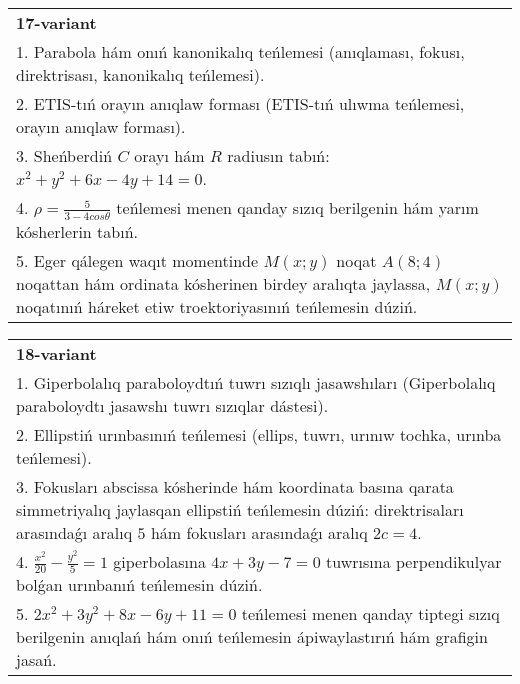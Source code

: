\documentclass{article}
\begin{document}
\begin{tabular}{m{17cm}}
\textbf{17-variant}\\
1. Parabola hám onıń kanonikalıq teńlemesi (anıqlaması, fokusı, direktrisası, kanonikalıq teńlemesi).\\

2. ETIS-tıń orayın anıqlaw forması (ETIS-tıń ulıwma teńlemesi, orayın anıqlaw forması).\\

3. Sheńberdiń $C$ orayı hám $R$ radiusın tabıń: $x^2+y^2+6 x-4 y+14=0$.\\

4. $\rho = \frac{5}{3 - 4cos\theta}$ teńlemesi menen qanday sızıq berilgenin hám yarım kósherlerin tabıń.  \\

5. Eger qálegen waqıt momentinde $M(x;y)$ noqat $A(8;4)$ noqattan hám ordinata kósherinen birdey aralıqta jaylassa, $M(x;y)$ noqatınıń háreket etiw troektoriyasınıń teńlemesin dúziń.  
\end{tabular}
\vspace{1cm}


\begin{tabular}{m{17cm}}
\textbf{18-variant}\\
1. Giperbolalıq paraboloydtıń tuwrı sızıqlı jasawshıları (Giperbolalıq paraboloydtı jasawshı tuwrı sızıqlar dástesi).\\

2. Ellipstiń urınbasınıń teńlemesi (ellips, tuwrı, urınıw tochka, urınba teńlemesi).\\

3. Fokusları abscissa kósherinde hám koordinata basına qarata simmetriyalıq jaylasqan ellipstiń teńlemesin dúziń: direktrisaları arasındaǵı aralıq $5$ hám fokusları arasındaǵı aralıq $2 c=4$.\\

4. $\frac{x^{2}}{20} - \frac{y^{2}}{5} = 1$ giperbolasına $4x + 3y - 7 = 0$ tuwrısına perpendikulyar bolǵan urınbanıń teńlemesin dúziń.  \\

5. $2x^{2} + 3y^{2} + 8x - 6y + 11 = 0$ teńlemesi menen qanday tiptegi sızıq berilgenin anıqlań hám onıń teńlemesin ápiwaylastırıń hám grafigin jasań.  
\end{tabular}
\vspace{1cm}
\end{document}
